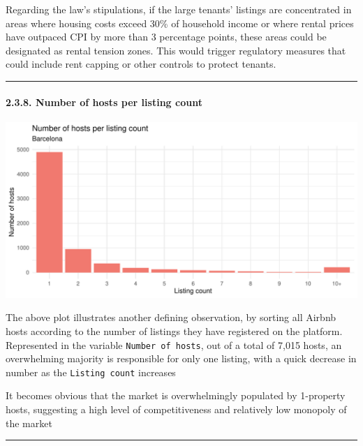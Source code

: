 \documentclass[
]{article}
\begin{document}
Regarding the law's stipulations, if the large tenants' listings are
concentrated in areas where housing costs exceed 30\% of household
income or where rental prices have outpaced CPI by more than 3
percentage points, these areas could be designated as rental tension
zones. This would trigger regulatory measures that could include rent
capping or other controls to protect tenants.

\begin{center}\rule{0.5\linewidth}{0.5pt}\end{center}

\hypertarget{number-of-hosts-per-listing-count}{%
\paragraph{2.3.8. Number of hosts per listing
count}\label{number-of-hosts-per-listing-count}}

\begin{center}\includegraphics{Barcelona-AirBnB-Insights_files/figure-latex/plot8-1} \end{center}

The above plot illustrates another defining observation, by sorting all
Airbnb hosts according to the number of listings they have registered on
the platform. Represented in the variable \texttt{Number\ of\ hosts},
out of a total of 7,015 hosts, an overwhelming majority is responsible
for only one listing, with a quick decrease in number as the
\texttt{Listing\ count} increases

It becomes obvious that the market is overwhelmingly populated by
1-property hosts, suggesting a high level of competitiveness and
relatively low monopoly of the market

\begin{center}\rule{0.5\linewidth}{0.5pt}\end{center}
\end{document}

